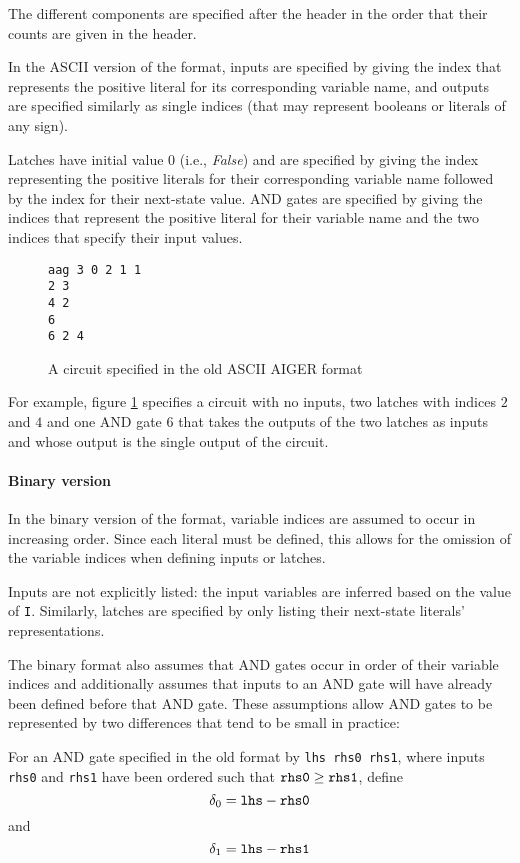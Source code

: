 \documentclass[12pt,a4paper,twoside,openright]{report}
\begin{document}
{{The different components are specified after the header
in the order that their counts are given in the header.

In the ASCII version of the format, inputs are specified by giving the
index that represents the positive literal for its corresponding variable name,
and outputs are specified similarly as single indices (that may represent
booleans or literals of any sign).

Latches have initial value 0 (i.e., {\it False}) and are specified by giving the
index representing the positive literals for their corresponding variable name
followed by the index for their next-state value.
AND gates are specified by giving the indices that represent the positive literal
for their variable name and the two indices that specify their input values.

\begin{figure}[h]
\centering
\begin{verbatim}
aag 3 0 2 1 1
2 3
4 2
6
6 2 4
\end{verbatim}
\caption{
A circuit specified in the old ASCII AIGER format
}
\label{aagCircuit}
\end{figure}

For example, figure \ref{aagCircuit} specifies a circuit with
no inputs, two latches with indices $2$ and $4$ and one AND gate
$6$ that takes the outputs of the two latches as inputs and whose
output is the single output of the circuit.}

\paragraph{Binary version}{
In the binary version of the format, variable indices are assumed to
occur in increasing order. Since each literal must be defined, this allows
for the omission of the variable indices when defining inputs or latches.

Inputs are not explicitly listed: the input variables are inferred based on
the value of \verb,I,.
Similarly, latches are specified by only listing their next-state literals'
representations.

The binary format also assumes that AND gates occur in order of their
variable indices and additionally assumes that inputs to an AND gate will
have already been defined before that AND gate.
These assumptions allow AND gates to be represented by two differences
that tend to be small in practice:

For an AND gate specified in the old format by \verb,lhs rhs0 rhs1,,
where inputs \verb,rhs0, and \verb,rhs1, have been ordered such that
$\verb,rhs0, \geq \verb,rhs1,$, define
$$\delta_0 = \verb,lhs, - \verb,rhs0,$$
and
$$\delta_1 = \verb,lhs, - \verb,rhs1,$$

}}
\end{document}
